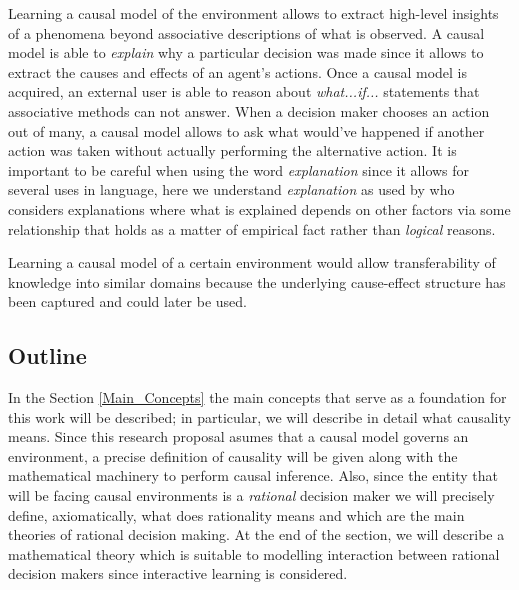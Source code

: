 \documentclass[english,letterpaper,12pt,final]{article}
\theoremstyle{definition}
\begin{document}

Learning a causal model of the environment allows to extract high-level insights of a phenomena beyond associative descriptions of what is observed. A causal model is able to \textit{explain} why a particular decision was made since it allows to extract the causes and effects of an agent's actions. Once a causal model is acquired, an external user is able to reason about \textit{what...if...} statements that associative methods can not answer. When a decision maker chooses an action out of many, a causal model allows to ask what would've happened if another action was taken without actually performing the alternative action. It is important to be careful when using the word \textit{explanation} since it allows for several uses in language, here we understand \textit{explanation} as used by \cite{woodward2005making} who considers explanations where what is explained depends on other factors via some relationship that holds as a matter of empirical fact rather than \textit{logical} reasons.

Learning a causal model of a certain environment would allow transferability of knowledge into similar domains because the underlying cause-effect structure has been captured and could later be used.
\subsection{Outline}
In the Section \ref{Main_Concepts} the main concepts that serve as a foundation for this work will be described; in particular, we will describe in detail what causality means. Since this research proposal asumes that a causal model governs an environment, a precise definition of causality will be given along with the mathematical machinery to perform causal inference. Also, since the entity that will be facing causal environments is a \textit{rational} decision maker we will precisely define, axiomatically, what does rationality means and which are the main theories of rational decision making. At the end of the section, we will describe a mathematical theory which is suitable to modelling interaction between rational decision makers since interactive learning is considered.
\end{document}
